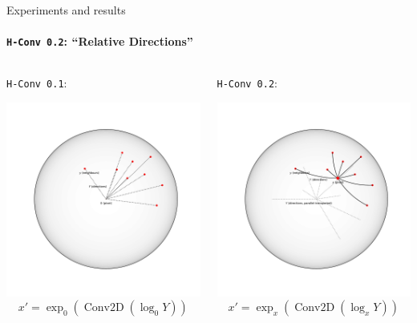 \begin{frame}{Experiments and results}
    \framesubtitle{\texttt{H-Conv 0.2}: ``Relative Directions''}

    \begin{columns}
        \begin{column}{.45\linewidth}
            \texttt{H-Conv 0.1}:

            \includegraphics[width=.85\linewidth]{art/absolute-locations.pdf}
            \[ x' = \exp_0\left(
                \operatorname{Conv2D}\left(
                    \log_0 Y
                    \right)\right) \]
        \end{column}
        \begin{column}{.45\linewidth}
            \texttt{H-Conv 0.2}:

            \includegraphics[width=.85\linewidth]{art/relative-locations.pdf}
            \[ x' = \exp_x\left(
                \operatorname{Conv2D}\left(
                    \log_x Y\right)\right) \]
        \end{column}
    \end{columns}
\end{frame}

